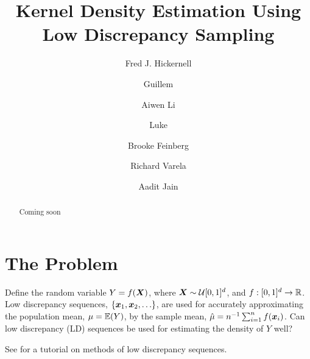 \documentclass[letterpaper]{amsart}
\begin{document}
\title{Kernel Density Estimation Using Low Discrepancy Sampling}
\author{Fred J. Hickernell}
\author{Guillem}
\author{Aiwen Li}
\author{Luke}
\author{Brooke Feinberg}
\author{Richard Varela}
\author{Aadit Jain}
\begin{abstract} Coming soon
\end{abstract}

\maketitle

\section{The Problem} \label{sec:problem}

Define the random variable $Y = f(\boldsymbol{X})$, where $\boldsymbol{X} \sim \mathcal{U}[0,1]^d$, and $f:[0,1]^d \to \mathbb{R}$.  Low discrepancy sequences, $\{\boldsymbol{x}_1, \boldsymbol{x}_2, \ldots \}$, are used for accurately approximating  the population mean, $\mu = \operatorname{\mathbb{E}}(Y)$, by the sample mean, $\hat{\mu} = n^{-1} \sum_{i=1}^n f(\boldsymbol{x}_i)$.   Can low discrepancy (LD) sequences be used for estimating the density of $Y$ well?

See \cite{DicEtal14a} for a tutorial on methods of low discrepancy sequences.
\end{document}
